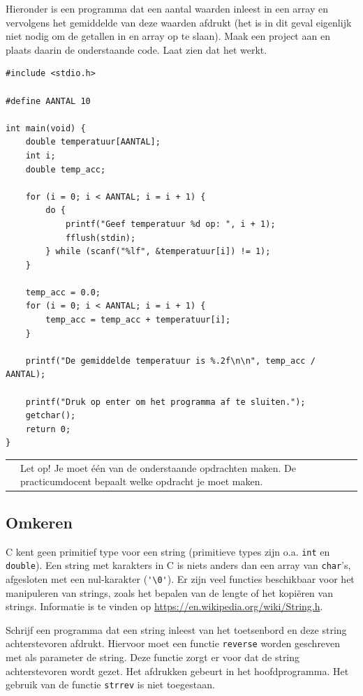 \documentclass[a4paper,10pt,fleqn,twoside]{article}
\newcommand{\letop}{%
\vspace*{2ex}
\begin{mdframed}[outerlinewidth = 1 ,%
roundcorner = 4 pt,%
leftmargin = 40,%
rightmargin = 40,%
backgroundcolor = yellow!40,%
outerlinecolor = red!70!black,%
innertopmargin = \topskip,%
splittopskip = \topskip,%
]
\begin{tabularx}{\linewidth}{m{1cm}X}
\Large\leftpointright & Let op! Je moet één van de onderstaande opdrachten maken. De practicumdocent bepaalt welke opdracht je moet maken.
\end{tabularx}
\end{mdframed}
}
\begin{document}

Hieronder is een programma dat een aantal waarden inleest in een array en vervolgens het gemiddelde van deze waarden afdrukt (het is in dit geval eigenlijk niet nodig om de getallen in en array op te slaan). Maak een project aan en plaats daarin de onderstaande code. Laat zien dat het werkt.


\begin{lstlisting}
#include <stdio.h>

#define AANTAL 10

int main(void) {
    double temperatuur[AANTAL];
    int i;
    double temp_acc;

    for (i = 0; i < AANTAL; i = i + 1) {
        do {
            printf("Geef temperatuur %d op: ", i + 1);
            fflush(stdin);
        } while (scanf("%lf", &temperatuur[i]) != 1);
    }

    temp_acc = 0.0;
    for (i = 0; i < AANTAL; i = i + 1) {
        temp_acc = temp_acc + temperatuur[i];
    }

    printf("De gemiddelde temperatuur is %.2f\n\n", temp_acc / AANTAL);

    printf("Druk op enter om het programma af te sluiten.");
    getchar();
    return 0;
}
\end{lstlisting}

\letop

\subsection{Omkeren}
C kent geen primitief type voor een string (primitieve types zijn o.a. \lstinline|int| en \lstinline|double|). Een string met karakters in C is niets anders dan een array van \lstinline|char|’s, afgesloten met een nul-karakter (\lstinline|'\0'|). Er zijn veel functies beschikbaar voor het manipuleren van strings, zoals het bepalen van de lengte of het kopiëren van strings. Informatie is te vinden op \url{https://en.wikipedia.org/wiki/String.h}.

Schrijf een programma dat een string inleest van het toetsenbord en deze string achterstevoren afdrukt. Hiervoor moet een functie \lstinline|reverse| worden geschreven met als parameter de string. Deze functie zorgt er voor dat de string achterstevoren wordt gezet. Het afdrukken gebeurt in het hoofdprogramma. Het gebruik van de functie \lstinline|strrev| is niet toegestaan.
\end{document}
